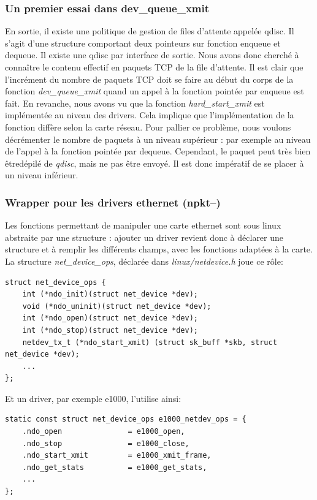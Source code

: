 \documentclass[a4paper]{article}
\begin{document}
\subsubsection{Un premier essai dans dev\_queue\_xmit}
En sortie, il existe une politique de gestion de files d'attente appelée qdisc. Il s'agit d'une structure 
comportant deux pointeurs sur fonction enqueue et dequeue. Il existe une qdisc par interface de sortie.
Nous avons donc cherché à connaître le contenu effectif en paquets TCP de la file d'attente.
Il est clair que l'incrément du nombre de paquets TCP doit se faire au début du corps de la fonction \textit{dev\_queue\_xmit}
quand un appel à la fonction pointée par enqueue est fait. En revanche, nous avons vu que la fonction 
\textit{hard\_start\_xmit} est implémentée au niveau des drivers. Cela implique que l'implémentation de la fonction 
diffère selon la carte réseau. Pour pallier ce problème, nous voulons décrémenter le nombre de paquets à un 
niveau supérieur : par exemple au niveau de l'appel à la fonction pointée par dequeue.
Cependant, le paquet peut très bien êtredépilé de \textit{qdisc}, mais ne pas
être envoyé. Il est donc impératif de se placer à un niveau inférieur.

\subsubsection{Wrapper pour les drivers ethernet (npkt--)}
Les fonctions permettant de manipuler une carte ethernet sont sous
linux abstraite par une structure : ajouter un driver revient donc
à déclarer une structure et à remplir les différents champs, avec
les fonctions adaptées à la carte.
La structure \textit{net\_device\_ops}, déclarée dans
\textit{linux/netdevice.h} joue ce rôle:
\begin{verbatim}
struct net_device_ops {
    int (*ndo_init)(struct net_device *dev);
    void (*ndo_uninit)(struct net_device *dev);
    int (*ndo_open)(struct net_device *dev);
    int (*ndo_stop)(struct net_device *dev);
    netdev_tx_t (*ndo_start_xmit) (struct sk_buff *skb, struct net_device *dev);
    ...
};
\end{verbatim}

Et un driver, par exemple e1000, l'utilise ainsi:
\begin{verbatim}
static const struct net_device_ops e1000_netdev_ops = {
    .ndo_open               = e1000_open,
    .ndo_stop               = e1000_close,
    .ndo_start_xmit         = e1000_xmit_frame,
    .ndo_get_stats          = e1000_get_stats,
    ...
};
\end{verbatim}
\end{document}
